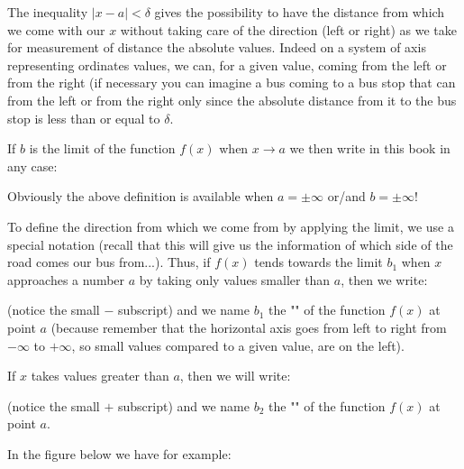 	The inequality $|x-a|<\delta$ gives the possibility to have the distance from which we come with our $x$ without taking care of the direction (left or right) as we take for measurement of distance the absolute values. Indeed on a system of axis representing ordinates values, we can, for a given value, coming from the left or from the right (if necessary you can imagine a bus coming to a bus stop that can from the left or from the right only since the absolute distance from it to the bus stop is less than or equal to $\delta$.
	
	If $b$ is the limit of the function $f (x)$ when $x\rightarrow a$ we then write in this book in any case:
	
	Obviously the above definition is available when $a=\pm \infty$ or/and $b=\pm \infty$!	
	
	To define the direction from which we come from by applying the limit, we use a special notation (recall that this will give us the information of which side of the road comes our bus from...). Thus, if $f (x)$ tends towards the limit $b_1$ when $x$ approaches a number $a$ by taking only values smaller than $a$, then we write:
	
	(notice the small $-$ subscript) and we name $b_1$ the "" of the function $f (x)$ at point $a$ (because remember that the horizontal axis goes from left to right from $-\infty$ to $+\infty$, so small values compared to a given value, are on the left).
	
	If $x$ takes values greater than $a$, then we will write:
	
	(notice the small $+$ subscript) and we name $b_2$ the "" of the function $f (x)$ at point $a$.
	
	In the figure below we have for example:
	
